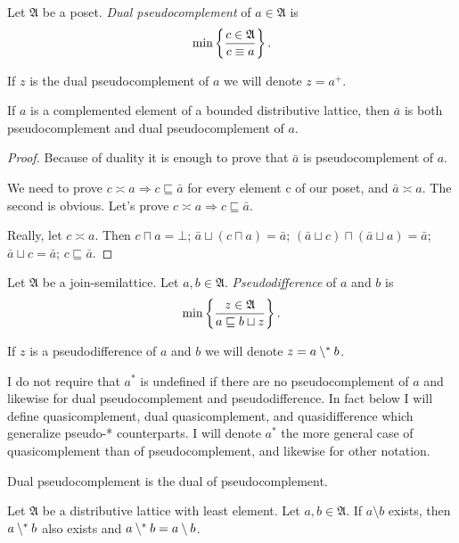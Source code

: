 \begin{defn}
Let $\mathfrak{A}$ be a poset. \emph{Dual
pseudocomplement} of $a\in\mathfrak{A}$ is
\[
\min\left\{ \frac{c\in\mathfrak{A}}{c\equiv a}\right\}.
\]


If $z$ is the dual pseudocomplement of $a$ we will denote $z=a^{+}$.\end{defn}
\begin{prop}\label{compl-is-pseud}
If $a$ is a complemented element of a bounded distributive lattice,
then $\bar{a}$ is both pseudocomplement and dual pseudocomplement
of $a$.\end{prop}
\begin{proof}
Because of duality it is enough to prove that $\bar{a}$ is pseudocomplement
of $a$.

We need to prove $c\asymp a\Rightarrow c\sqsubseteq\bar{a}$ for every
element c of our poset, and $\bar{a}\asymp a$. The second is obvious.
Let's prove $c\asymp a\Rightarrow c\sqsubseteq\bar{a}$.

Really, let $c\asymp a$. Then $c\sqcap a=\bot$; $\bar{a}\sqcup(c\sqcap a)=\bar{a}$;
$(\bar{a}\sqcup c)\sqcap(\bar{a}\sqcup a)=\bar{a}$; $\bar{a}\sqcup c=\bar{a}$;
$c\sqsubseteq\bar{a}$.\end{proof}
\begin{defn}
Let $\mathfrak{A}$ be a join-semilattice.
Let $a,b\in\mathfrak{A}$. \emph{Pseudodifference} of $a$ and $b$
is
\[
\min\left\{ \frac{z\in\mathfrak{A}}{a\sqsubseteq b\sqcup z}\right\}.
\]


If $z$ is a pseudodifference of $a$ and $b$ we will denote $z=a\setminus^{\ast} b$.\end{defn}
\begin{rem}
I do not require that $a^{\ast}$ is undefined if there are no pseudocomplement
of $a$ and likewise for dual pseudocomplement and pseudodifference.
In fact below I will define quasicomplement, dual quasicomplement,
and quasidifference which generalize pseudo-{*} counterparts. I will
denote $a^{\ast}$ the more general case of quasicomplement than of
pseudocomplement, and likewise for other notation.\end{rem}
\begin{obvious}
Dual pseudocomplement is the dual of pseudocomplement.\end{obvious}

\begin{thm}
Let $\mathfrak{A}$ be a distributive lattice with least element. Let $a,b\in\mathfrak{A}$.
If $a\setminus b$ exists, then $a\setminus^{\ast} b$ also exists and $a\setminus^{\ast} b=a\setminus b$.
\end{thm}

